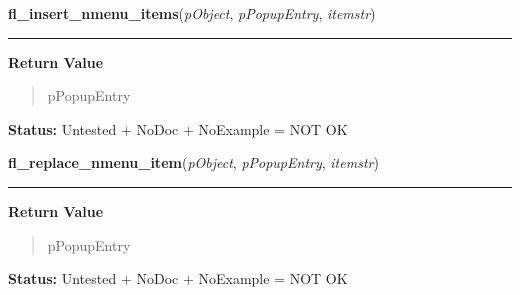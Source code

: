     \label{xformslib:library:fl_insert_nmenu_items}

    \vspace{0.5ex}

\hspace{.8\funcindent}\begin{boxedminipage}{\funcwidth}

    \raggedright \textbf{fl\_insert\_nmenu\_items}(\textit{pObject}, \textit{pPopupEntry}, \textit{itemstr})

    \vspace{-1.5ex}

    \rule{\textwidth}{0.5\fboxrule}
\setlength{\parskip}{2ex}
\setlength{\parskip}{1ex}
      \textbf{Return Value}
    \vspace{-1ex}

      \begin{quote}
      pPopupEntry

      \end{quote}

\textbf{Status:} Untested + NoDoc + NoExample = NOT OK



    \end{boxedminipage}

    \label{xformslib:library:fl_replace_nmenu_item}

    \vspace{0.5ex}

\hspace{.8\funcindent}\begin{boxedminipage}{\funcwidth}

    \raggedright \textbf{fl\_replace\_nmenu\_item}(\textit{pObject}, \textit{pPopupEntry}, \textit{itemstr})

    \vspace{-1.5ex}

    \rule{\textwidth}{0.5\fboxrule}
\setlength{\parskip}{2ex}
\setlength{\parskip}{1ex}
      \textbf{Return Value}
    \vspace{-1ex}

      \begin{quote}
      pPopupEntry

      \end{quote}

\textbf{Status:} Untested + NoDoc + NoExample = NOT OK



    \end{boxedminipage}

